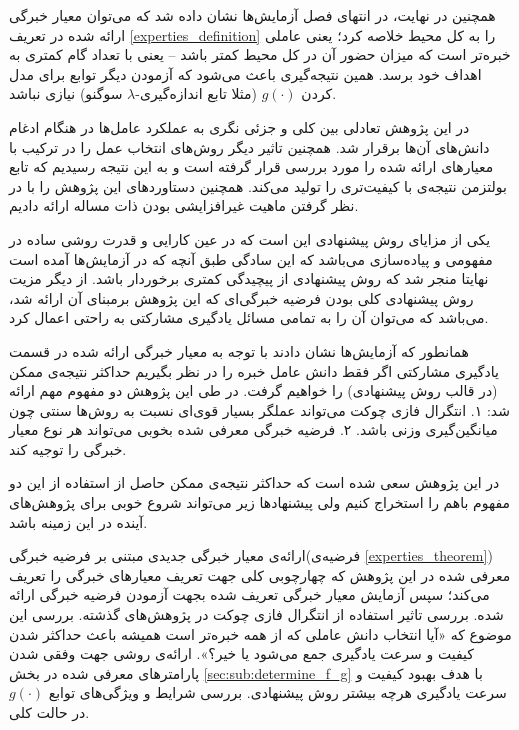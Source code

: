 همچنین در نهایت، در انتهای فصل آزمایش‌ها نشان داده شد که می‌توان معیار خبرگی ارائه شده در تعریف
\ref{experties_definition}
را به کل محیط خلاصه کرد؛ یعنی عاملی خبره‌تر است که میزان حضور آن در کل محیط کمتر باشد -- یعنی با تعداد گام کمتری به اهداف خود برسد. همین نتیجه‌گیری باعث می‌شود که آزمودن دیگر توابع برای مدل کردن $g(\cdot)$ (مثلا تابع اندازه‌گیری-$\lambda$ سوگنو) نیازی نباشد.

در این پژوهش تعادلی بین کلی و جزئی نگری به عملکرد عامل‌ها در هنگام ادغام دانش‌های آن‌ها برقرار شد. همچنین تاثیر دیگر روش‌های انتخاب عمل را در ترکیب با معیار‌های ارائه شده را مورد بررسی قرار گرفته است و به این نتیجه رسیدیم که تابع بولتزمن نتیجه‌ی با کیفیت‌تری را تولید می‌کند. همچنین دستاورد‌های این پژوهش را با در نظر گرفتن ماهیت غیرافزایشی بودن ذات مساله ارائه دادیم.

یکی از مزایای روش پیشنهادی این است که در عین کارایی و قدرت روشی ساده در مفهومی و پیاده‌سازی می‌باشد که این سادگی طبق آنچه که در آزمایش‌ها آمده است نهایتا منجر شد که روش پیشنهادی از پیچیدگی کمتری برخوردار باشد. از دیگر مزیت روش پیشنهادی کلی بودن فرضیه خبرگی‌ای که این پژوهش برمبنای آن ارائه شد، می‌باشد که می‌توان آن را به تمامی مسائل یادگیری مشارکتی به راحتی اعمال کرد.

همانطور که آزمایش‌ها نشان دادند با توجه به معیار خبرگی ارائه شده در قسمت یادگیری مشارکتی اگر فقط دانش عامل خبره را در نظر بگیریم حداکثر نتیجه‌ی ممکن (در قالب روش پیشنهادی) را خواهیم گرفت. در طی این پژوهش دو مفهوم مهم ارائه شد: ۱. انتگرال فازی چوکت می‌تواند عملگر بسیار قوی‌ای نسبت به روش‌ها سنتی چون میانگین‌گیری وزنی باشد. ۲. فرضیه خبرگی معرفی شده بخوبی می‌تواند هر نوع معیار خبرگی را توجیه کند.

در این پژوهش سعی شده است که حداکثر نتیجه‌ی ممکن حاصل از استفاده از این دو مفهوم باهم را استخراج کنیم ولی پیشنهادها زیر می‌تواند شروع خوبی برای پژوهش‌های آینده در این زمینه باشد.

\begin{enumerate}
 ارائه‌ی معیار خبرگی جدیدی مبتنی بر فرضیه خبرگی(فرضیه‌ی \ref{experties_theorem}) معرفی شده در این پژوهش که چهارچوبی کلی جهت تعریف معیارهای خبرگی را تعریف می‌کند؛ سپس آزمایش معیار خبرگی تعریف شده بجهت آزمودن فرضیه خبرگی ارائه شده.
 بررسی تاثیر استفاده از انتگرال فازی چوکت در پژوهش‌های گذشته.
 بررسی این موضوع که «آیا انتخاب دانش عاملی که از همه خبره‌تر است همیشه باعث حداکثر شدن کیفیت و سرعت یادگیری جمع می‌شود یا خیر؟».
 ارائه‌ی روشی جهت وفقی شدن پارامترهای معرفی شده در بخش \ref{sec:sub:determine_f_g} با هدف بهبود کیفیت و سرعت یادگیری هرچه بیشتر روش پیشنهادی.
 بررسی شرایط و ویژگی‌های توابع $g(\cdot)$ در حالت کلی.
\end{enumerate}